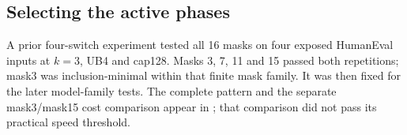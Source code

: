 \subsection{Selecting the active phases}
A prior four-switch experiment tested all 16 masks on four exposed HumanEval inputs at $k=3$, UB4 and cap128. Masks 3, 7, 11 and 15 passed both repetitions; mask3 was inclusion-minimal within that finite mask family. It was then fixed for the later model-family tests. The complete pattern and the separate mask3/mask15 cost comparison appear in ; that comparison did not pass its practical speed threshold.
